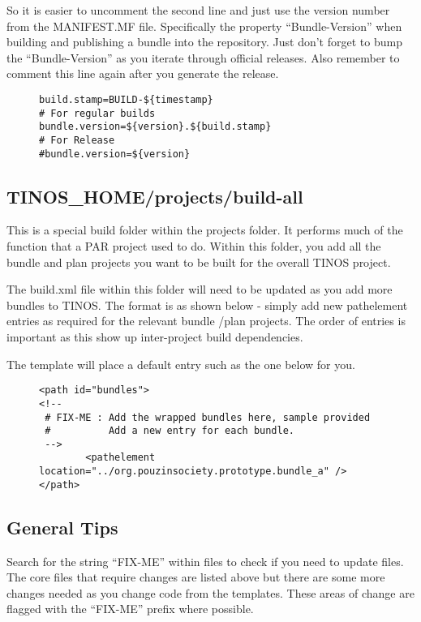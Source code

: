 So it is easier to uncomment the second line and just use the version number from
the MANIFEST.MF file. Specifically the property ``Bundle-Version'' when building
and publishing a bundle into the repository. Just don't forget to bump the
``Bundle-Version'' as you iterate through official releases. Also remember to
comment this line again after you generate the release.
\begin{figure}[H]
\begin{verbatim}
build.stamp=BUILD-${timestamp}
# For regular builds
bundle.version=${version}.${build.stamp}
# For Release
#bundle.version=${version}
\end{verbatim}
\end{figure}

\subsection{TINOS\_HOME/projects/build-all}
This is a special build folder within the projects folder. It performs much of the
function that a PAR project used to do. Within this folder, you add all the bundle
and plan projects you want to be built for the overall TINOS project. 

The build.xml file within this folder will need to be updated as you add
more bundles to TINOS. The format is as shown below - simply add new
pathelement entries as required for the relevant bundle /plan projects. The
order of entries is important as this show up inter-project build dependencies.

The template will place a default entry such as the one below for you.
\begin{figure}[H]
\begin{verbatim}
<path id="bundles">
<!--
 # FIX-ME : Add the wrapped bundles here, sample provided
 #          Add a new entry for each bundle.
 -->
        <pathelement location="../org.pouzinsociety.prototype.bundle_a" />
</path>
\end{verbatim}
\end{figure}

\subsection{General Tips}
Search for the string ``FIX-ME'' within files to check if you need to update files. The
core files that require changes are listed above but there are some more changes needed
as you change code from the templates. These areas of change are flagged with the
``FIX-ME'' prefix where possible.

